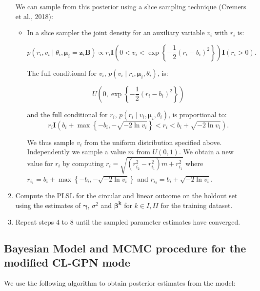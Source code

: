 \documentclass[11pt,]{article}
\begin{document}
\begin{appendices}
\begin{enumerate}
We can sample from this posterior using a slice sampling technique (Cremers et al., 2018): 

\begin{itemize}
\item In a slice sampler the joint density for an auxiliary variable $v_{i}$ with $r_{i}$ is:


$$p(r_{i}, v_{i}\mid \theta_{i}, \boldsymbol{\mu}_{i}=\boldsymbol{z}_{i}\boldsymbol{B}) \propto r_{i} \textbf{I}\left(0 < v_i < \exp\left\{ -\frac{1}{2}(r_{i} - b_{i})^2\right\}\right)\textbf{I}(r_i > 0).$$

\noindent The full conditional for $v_{i}$, $p(v_{i} \mid r_{i},\boldsymbol{\mu}_{i}, \theta_{i})$, is:

$$U\left(0, \exp\left\{-\frac{1}{2}(r_{i} -  b _{i})^2\right\}\right)$$

and the full conditional for $r_i$, $p(r_{i} \mid v_{i},\boldsymbol{\mu}_{i}, \theta_{i})$, is proportional to:
$$r_{i} \textbf{I}\left(b_{i} + \max\left\{-b_{i}, -\sqrt{-2\ln v_{i}}\right\} < r_{i} < b_{i} + \sqrt{-2\ln v_{i}}\right).$$

\noindent We thus sample $v_{i}$ from the uniform distribution specified above. Independently we sample a value $m$ from $U(0,1)$. We obtain a new value for $r_{i}$ by computing $ r_{i} = \sqrt{(r_{i_{2}}^{2}-r_{i_{1}}^{2})m + r_{i_{1}}^{2}}$ where $r_{i_{1}}=b_{i} +\max\left\{-b_{i}, -\sqrt{-2\ln v_{i}}\right\}$ and $ r_{i_{2}}= b_{i} + \sqrt{-2\ln v_{i}}$.
\end{itemize}

\item Compute the PLSL for the circular and linear outcome on the holdout set using the estimates of $\boldsymbol{\gamma}$, $\sigma^2$ and $\boldsymbol{\beta^{k}}$ for $k \in I,II$ for the training dataset.

\item Repeat steps 4 to 8 until the sampled parameter estimates have converged.

\end{enumerate}





\newpage
\subsection{Bayesian Model and MCMC procedure for the modified CL-GPN mode}\label{A2}

We use the following algorithm to obtain posterior estimates from the model:


\end{appendices}
\end{document}
